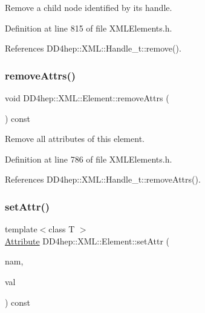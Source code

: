 Remove a child node identified by its handle. 



Definition at line 815 of file X\+M\+L\+Elements.\+h.



References D\+D4hep\+::\+X\+M\+L\+::\+Handle\+\_\+t\+::remove().

\hypertarget{class_d_d4hep_1_1_x_m_l_1_1_element_aad0a776742e12a27fba79e9dcfd06d23}{}\label{class_d_d4hep_1_1_x_m_l_1_1_element_aad0a776742e12a27fba79e9dcfd06d23} 
\subsubsection{\texorpdfstring{remove\+Attrs()}{removeAttrs()}}
{\footnotesize\ttfamily void D\+D4hep\+::\+X\+M\+L\+::\+Element\+::remove\+Attrs (\begin{DoxyParamCaption}{ }\end{DoxyParamCaption}) const\hspace{0.3cm}{\ttfamily [inline]}}



Remove all attributes of this element. 



Definition at line 786 of file X\+M\+L\+Elements.\+h.



References D\+D4hep\+::\+X\+M\+L\+::\+Handle\+\_\+t\+::remove\+Attrs().

\hypertarget{class_d_d4hep_1_1_x_m_l_1_1_element_afdd37ff40f7d2a336e01f5fb70d50c5e}{}\label{class_d_d4hep_1_1_x_m_l_1_1_element_afdd37ff40f7d2a336e01f5fb70d50c5e} 
\subsubsection{\texorpdfstring{set\+Attr()}{setAttr()}}
{\footnotesize\ttfamily template$<$class T $>$ \\
\hyperlink{namespace_d_d4hep_1_1_x_m_l_a5c19b7116be99d69b4b22d911357baaf}{Attribute} D\+D4hep\+::\+X\+M\+L\+::\+Element\+::set\+Attr (\begin{DoxyParamCaption}\item[{const \hyperlink{namespace_d_d4hep_1_1_x_m_l_a09e5d9cc86ed782f6826dfe0778c1815}{Xml\+Char} $\ast$}]{nam,  }\item[{const \hyperlink{class_t}{T} \&}]{val }\end{DoxyParamCaption}) const\hspace{0.3cm}{\ttfamily [inline]}}



